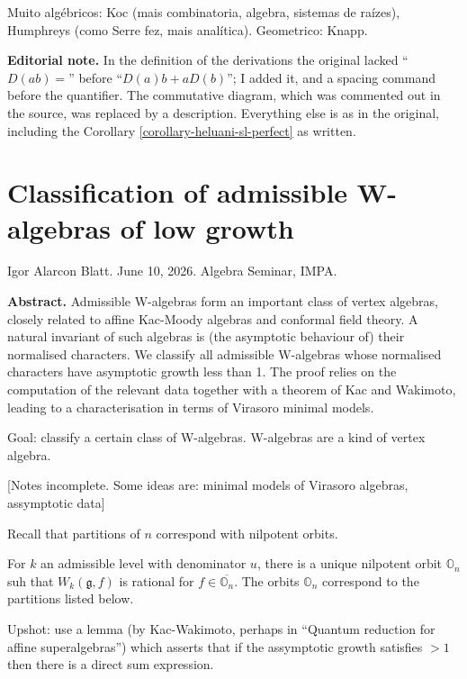 \medskip{}
Muito algébricos: Koc (mais combinatoria,
algebra, sistemas de raízes), Humphreys (como
Serre fez, mais analítica). Geometrico:
Knapp.

\medskip\noindent
{\bf Editorial note.}
In the definition of the derivations
the original lacked ``$D(ab)=$'' before
``$D(a)b+aD(b)$''; I added it, and
a spacing command before the quantifier.
The commutative diagram, which was
commented out in the source, was replaced
by a description. Everything else is
as in the original, including the
Corollary
\ref{corollary-heluani-sl-perfect} as
written.

\section{Classification of admissible
W-algebras of low growth}
\label{section-w-algebras-of-low-growth}

\noindent
Igor Alarcon Blatt. June 10, 2026.
Algebra Seminar, IMPA.

\medskip\noindent
{\bf Abstract.} 
Admissible W-algebras form an important class
of vertex algebras, closely related to affine
Kac-Moody algebras and conformal field
theory. A natural invariant of such algebras
is (the asymptotic behaviour of) their
normalised characters. We classify all
admissible W-algebras whose normalised
characters have asymptotic growth less than
1. The proof relies on the computation of the
relevant data together with a theorem of Kac
and Wakimoto, leading to a characterisation
in terms of Virasoro minimal models.

\medskip\noindent
Goal: classify a certain class of W-algebras.
W-algebras are a kind of vertex algebra.

[Notes incomplete.
Some ideas are: minimal models
of Virasoro algebras,
assymptotic data]

\medskip\noindent
Recall that partitions of $n$
correspond with nilpotent orbits.

\begin{theorem}[Arakawa, 2015]
\label{theorem-arakawa}
For $k$ an admissible level with
denominator $u$, there is a unique
nilpotent orbit $\mathbb{O}_n$
suh that $W_k(\mathfrak{g},f)$
is rational for $f \in \overline{
\mathbb{O}_n}$. The orbits $\mathbb{O}_n$
correspond to the partitions listed below.
\end{theorem}

\medskip\noindent
Upshot: use a lemma 
(by Kac-Wakimoto, perhaps in
``Quantum reduction
for affine superalgebras'') which asserts
that if the assymptotic growth
satisfies $>1$ then there is a direct
sum expression.



